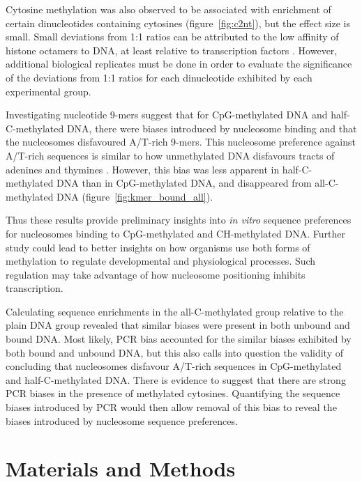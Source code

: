\documentclass[parskip=full, numbers=noenddot]{scrbook}
\begin{document}
Cytosine methylation was also observed to be associated with enrichment of certain dinucleotides containing cytosines (figure~\ref{fig:c2nt}), but the effect size is small.  Small deviations from 1:1 ratios can be attributed to the low affinity of histone octamers to DNA, at least relative to transcription factors \citep{struhl_determinants_2013}. %
However, additional biological replicates must be done in order to evaluate the significance of the deviations from 1:1 ratios for each dinucleotide exhibited by each experimental group.

Investigating nucleotide 9-mers suggest that for CpG-methylated DNA and half-C-methylated DNA, there were biases introduced by nucleosome binding and that the nucleosomes disfavoured A/T-rich 9-mers.  This nucleosome preference against A/T-rich sequences is similar to how unmethylated DNA disfavours tracts of adenines and thymines \citep{struhl_determinants_2013}. However, this bias was less apparent in half-C-methylated DNA than in CpG-methylated DNA, and disappeared from all-C-methylated DNA (figure~\ref{fig:kmer_bound_all}).

Thus these results provide preliminary insights into \emph{in vitro} sequence preferences for nucleosomes binding to CpG-methylated and CH-methylated DNA.  Further study could lead to better insights on how organisms use both forms of methylation to regulate developmental and physiological processes.  Such regulation may take advantage of how nucleosome positioning inhibits transcription.

Calculating sequence enrichments in the all-C-methylated group relative to the plain DNA group revealed that similar biases were present in both unbound and bound DNA.  Most likely, PCR bias accounted for the similar biases exhibited by both bound and unbound DNA, but this also calls into question the validity of concluding that nucleosomes disfavour A/T-rich sequences in CpG-methylated and half-C-methylated DNA.  There is evidence to suggest that there are strong PCR biases in the presence of methylated cytosines.  Quantifying the sequence biases introduced by PCR would then allow removal of this bias to reveal the biases introduced by nucleosome sequence preferences.

\section{Materials and Methods}
\label{sec:emsaselex_methods}
\end{document}
